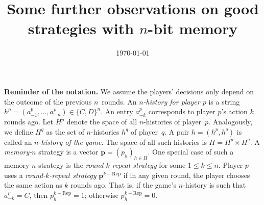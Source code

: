 \documentclass{article}
\title{\vspace{-2cm} Some further observations on good strategies with $n$-bit memory\\[-1.2cm]}
\date{\today}
\theoremstyle{definition}
\begin{document}
\maketitle

\onehalfspacing

\noindent

\noindent
{\bf Reminder of the notation.} We assume the players' decisions only depend on the outcome of the previous $n$~rounds. 
An {\it $n$-history for player $p$} is a string $h^p=(a^p_{-1},\ldots,a^p_{-n})\!\in\!\{C,D\}^n$. 
An entry $a^p_{-k}$ corresponds to player $p$'s action $k$ rounds ago. 
Let $H^p$ denote the space of all $n$-histories of player~$p$. 
Analogously, we define $H^q$ as the set of $n$-histories $h^q$ of player~$q$. 
A pair $h\!=\!(h^p,h^q)$ is called an {\it $n$-history of the game}. 
The space of all such histories is $H=H^p\times H^q$. 
A {\it memory-$n$} strategy is a vector $\mathbf{p}=(p_h)_{h\in H}$. 
One special case of such a memory-$n$ strategy is the  {\it round-$k$-repeat strategy} for some $1\!\le\!k\!\le\!n$. 
Player $p$ uses a {\it round-$k$-repeat strategy} $\mathbf{p}^{k-\text{Rep}}$ if in any given round, the player chooses the same action as $k$ rounds ago. That is, if the game's $n$-history is such that $a^p_{-k}\!=\!C$, then $p^{k-\text{Rep}}_h\!=\!1$; otherwise $p^{k-\text{Rep}}_h\!=\!0$.
\end{document}
